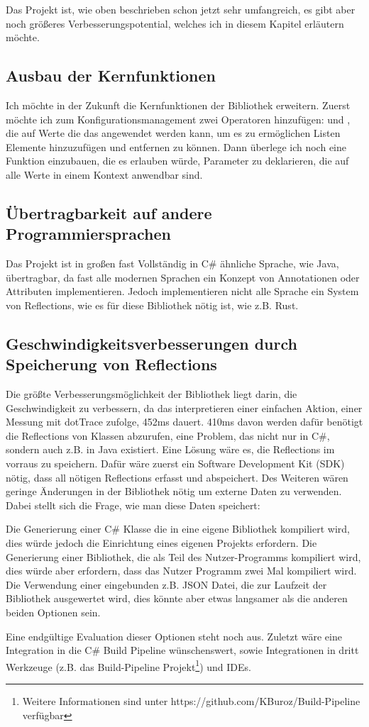 Das Projekt ist, wie oben beschrieben schon jetzt sehr umfangreich, es gibt aber noch grö\ss eres Verbesserungspotential, welches ich in diesem Kapitel erläutern möchte.
\subsection{Ausbau der Kernfunktionen}\label{subsec:MoreFunctions}
Ich möchte in der Zukunft die Kernfunktionen der Bibliothek erweitern.
Zuerst möchte ich zum Konfigurationsmanagement zwei Operatoren hinzufügen:  und , 
die auf Werte die das  angewendet werden kann, um es zu ermöglichen Listen Elemente hinzuzufügen und entfernen zu können.
Dann überlege ich noch eine Funktion einzubauen, die es erlauben würde, Parameter zu deklarieren, die auf alle Werte in einem Kontext anwendbar sind.
\subsection{Übertragbarkeit auf andere Programmiersprachen}\label{subsec:PortabilityToOtherLangs}
Das Projekt ist in gro\ss en fast Vollständig in C\# ähnliche Sprache, wie Java, übertragbar, da fast alle modernen Sprachen ein Konzept von Annotationen oder Attributen implementieren.
Jedoch implementieren nicht alle Sprache ein System von Reflections, wie es für diese Bibliothek nötig ist, wie z.B. Rust.
\subsection{Geschwindigkeitsverbesserungen durch Speicherung von Reflections}\label{subsec:StoringReflections}
Die grö\ss te Verbesserungsmöglichkeit der Bibliothek liegt darin, die Geschwindigkeit zu verbessern,
da das interpretieren einer einfachen Aktion, einer Messung mit dotTrace zufolge, 452ms dauert.
410ms davon werden dafür benötigt die Reflections von Klassen abzurufen, eine Problem, das nicht nur in C\#, sondern auch z.B. in Java existiert.
Eine Lösung wäre es, die Reflections im vorraus zu speichern.
Dafür wäre zuerst ein Software Development Kit (SDK) nötig, dass all nötigen Reflections erfasst und abspeichert.
Des Weiteren wären geringe \"Anderungen in der Bibliothek nötig um externe Daten zu verwenden.
Dabei stellt sich die Frage, wie man diese Daten speichert:
\begin{outline}
 \1 Die Generierung einer C\# Klasse die in eine eigene Bibliothek kompiliert wird, dies würde jedoch die Einrichtung eines eigenen Projekts erfordern.
 \1 Die Generierung einer Bibliothek, die als Teil des Nutzer-Programms kompiliert wird, dies würde aber erfordern, dass das Nutzer Programm zwei Mal kompiliert wird.
 \1 Die Verwendung einer eingebunden z.B. JSON Datei, die zur Laufzeit der Bibliothek ausgewertet wird, dies könnte aber etwas langsamer als die anderen beiden Optionen sein.
\end{outline}
Eine endgültige Evaluation dieser Optionen steht noch aus.
Zuletzt wäre eine Integration in die C\# Build Pipeline wünschenswert, sowie Integrationen in dritt Werkzeuge (z.B. das Build-Pipeline
 Projekt\footnote{Weitere Informationen sind unter https://github.com/KBuroz/Build-Pipeline verfügbar}) und IDEs.
